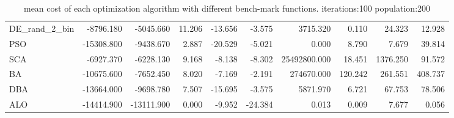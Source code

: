 \documentclass[12pt]{article}
\begin{document}
\begin{table}[H]
\begin{adjustbox}{width=1\textwidth}
\begin{tabular}{lrrrrrrrrr}
    DE\_rand\_2\_bin & -8796.180 & -5045.660 & 11.206 & -13.656 & -3.575 & 3715.320 & 0.110 & 24.323 & 12.928 \\
    PSO & -15308.800 & -9438.670 & 2.887 & -20.529 & -5.021 & 0.000 & 8.790 & 7.679 & 39.814 \\
    SCA & -6927.370 & -6228.130 & 9.168 & -8.138 & -8.302 & 25492800.000 & 18.451 & 1376.250 & 91.572 \\
    BA & -10675.600 & -7652.450 & 8.020 & -7.169 & -2.191 & 274670.000 & 120.242 & 261.551 & 408.737 \\
    DBA & -13664.000 & -9698.780 & 7.507 & -15.695 & -3.575 & 5871.970 & 6.721 & 67.753 & 78.506 \\
    ALO & -14414.900 & -13111.900 & 0.000 & -9.952 & -24.384 & 0.013 & 0.009 & 7.677 & 0.056 \\
    \bottomrule
\end{tabular}

\end{adjustbox}
\caption{mean cost of each optimization algorithm with different bench-mark functions. iterations:100 population:200} 
\label{tab:summary}
\end{table}
\end{document}
